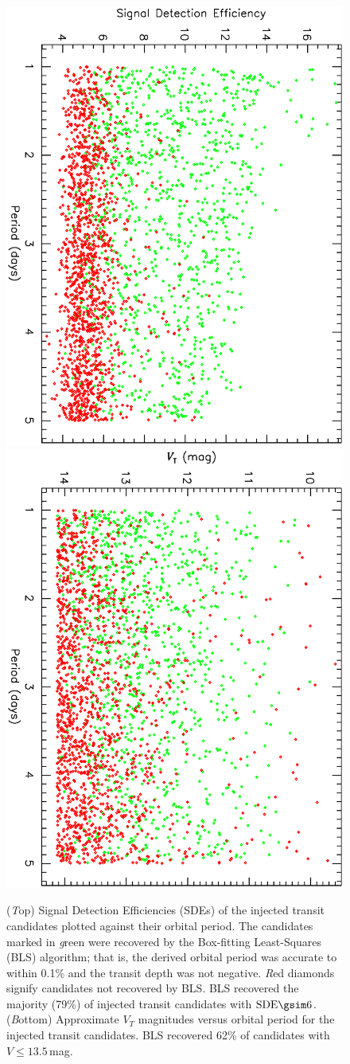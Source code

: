 \begin{figure}
\begin{center}
\centering
\includegraphics[width=.55\textwidth, angle=90]{7_comp_b} \\
\includegraphics[width=.55\textwidth, angle=90]{7_comp_a} \\
\caption[SDE and $V_{T}$ versus period for BLS-recovered transits]{%
({\textit Top}) Signal Detection Efficiencies (SDEs) of the injected transit candidates plotted against their orbital period.
The candidates marked in {\textit green} were recovered by the Box-fitting Least-Squares (BLS) algorithm; that is, the derived orbital period was accurate to within 0.1\% and the transit depth was not negative.
{\textit Red diamonds} signify candidates not recovered by BLS.\@
BLS recovered the majority (79\%) of injected transit candidates with $\mathrm{SDE}\gsim6$.
({\textit Bottom}) Approximate $V_{T}$ magnitudes versus orbital period for the injected transit candidates.
BLS recovered 62\% of candidates with $V\leq13.5$\,mag.%
}\label{cha:human:sec:model:fig:rec}
\end{center}
\end{figure}

